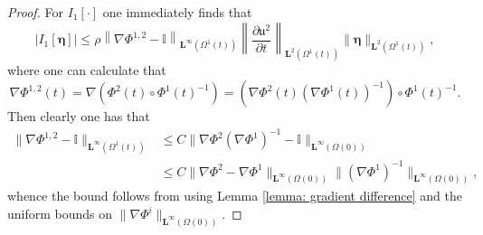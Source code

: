 \documentclass[a4paper]{amsart}
\numberwithin{equation}{section}
\newcommand{\ddt}[1]{\frac{\partial #1}{\partial t}}
\newcommand{\grad}{\nabla}
\theoremstyle{plain}
\newcommand{\mbf}[1]{\mathbf{#1}}
\newcommand{\mbb}[1]{\mathbb{#1}}
\newcommand{\utwo}{\boldsymbol{\mathfrak{u}}^2}
\begin{document}
   \begin{proof}
    For $I_1[\cdot]$ one immediately finds that
    \[ \left|I_1[\boldsymbol{\eta}]\right| \leq \rho \left\| \grad \Phi^{1,2} - \mbb{I}\right\|_{\mbf{L}^\infty(\Omega^1(t))}\left\|\ddt{\utwo}\right\|_{\mbf{L}^2(\Omega^1(t))} \|\boldsymbol{\eta}\|_{\mbf{L}^2(\Omega^1(t))},  \]
       where one can calculate that
       \[\grad \Phi^{1,2}(t) = \grad (\Phi^2(t) \circ \Phi^{1}(t)^{-1}) = \left(\grad \Phi^2(t)(\grad \Phi^1(t))^{-1} \right) \circ \Phi^1(t)^{-1}.\]
       Then clearly one has that
       \begin{align*}
           \|\grad \Phi^{1,2} - \mbb{I}\|_{\mbf{L}^{\infty}(\Omega^1(t))} &\leq C \|\grad \Phi^{2} (\grad \Phi^1)^{-1}  - \mbb{I}\|_{\mbf{L}^{\infty}(\Omega(0))}\\
           &\leq C \|\grad \Phi^{2} -\grad \Phi^1 \|_{\mbf{L}^{\infty}(\Omega(0))} \|(\grad \Phi^1)^{-1} \|_{\mbf{L}^{\infty}(\Omega(0))},
       \end{align*}
       whence the bound follows from using Lemma \ref{lemma: gradient difference} and the uniform bounds on $\|\grad \Phi^i\|_{\mbf{L}^\infty(\Omega(0))}$.
       

\end{proof}
\end{document}
